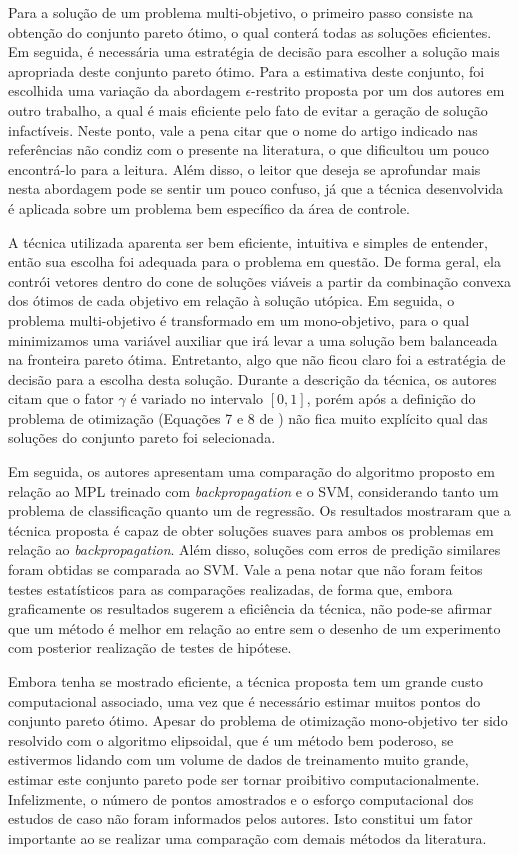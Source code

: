 \documentclass[peerreview]{IEEEtran}
\begin{document}
	Para a solução de um problema multi-objetivo, o primeiro passo consiste na obtenção do conjunto pareto ótimo, o qual conterá todas as soluções eficientes. Em seguida, é necessária uma estratégia de decisão para escolher a solução mais apropriada deste conjunto pareto ótimo. Para a estimativa deste conjunto, foi escolhida uma variação da abordagem $\epsilon$-restrito proposta por um dos autores em outro trabalho, a qual é mais eficiente pelo fato de evitar a geração de solução infactíveis. Neste ponto, vale a pena citar que o nome do artigo indicado nas referências não condiz com o presente na literatura, o que dificultou um pouco encontrá-lo para a leitura. Além disso, o leitor que deseja se aprofundar mais nesta abordagem pode se sentir um pouco confuso, já que a técnica desenvolvida é aplicada sobre um problema bem específico da área de controle. 
	
	A técnica utilizada aparenta ser bem eficiente, intuitiva e simples de entender, então sua escolha foi adequada para o problema em questão. De forma geral, ela contrói vetores dentro do cone de soluções viáveis a partir da combinação convexa dos ótimos de cada objetivo em relação à solução utópica. Em seguida, o problema multi-objetivo é transformado em um mono-objetivo, para o qual minimizamos uma variável auxiliar que irá levar a uma solução bem balanceada na fronteira pareto ótima. Entretanto, algo que não ficou claro foi a estratégia de decisão para a escolha desta solução. Durante a descrição da técnica, os autores citam que o fator $\gamma$ é variado no intervalo $[0,1]$, porém após a definição do problema de otimização (Equações 7 e 8 de \cite{mobj}) não fica muito explícito qual das soluções do conjunto pareto foi selecionada.
	
	Em seguida, os autores apresentam uma comparação do algoritmo proposto em relação ao MPL treinado com \textit{backpropagation} e o SVM, considerando tanto um problema de classificação quanto um de regressão. Os resultados mostraram que a técnica proposta é capaz de obter soluções suaves para ambos os problemas em relação ao \textit{backpropagation}. Além disso, soluções com erros de predição similares foram obtidas se comparada ao SVM. Vale a pena notar que não foram feitos testes estatísticos para as comparações realizadas, de forma que, embora graficamente os resultados sugerem a eficiência da técnica, não pode-se afirmar que um método é melhor em relação ao entre sem o desenho de um experimento com posterior realização de testes de hipótese. 
	
	Embora tenha se mostrado eficiente, a técnica proposta tem um grande custo computacional associado, uma vez que é necessário estimar muitos pontos do conjunto pareto ótimo. Apesar do problema de otimização mono-objetivo ter sido resolvido com o algoritmo elipsoidal, que é um método bem poderoso, se estivermos lidando com um volume de dados de treinamento muito grande, estimar este conjunto pareto pode ser tornar proibitivo computacionalmente. Infelizmente, o número de pontos amostrados e o esforço computacional dos estudos de caso não foram informados pelos autores. Isto constitui um fator importante ao se realizar uma comparação com demais métodos da literatura.
	
\end{document}
